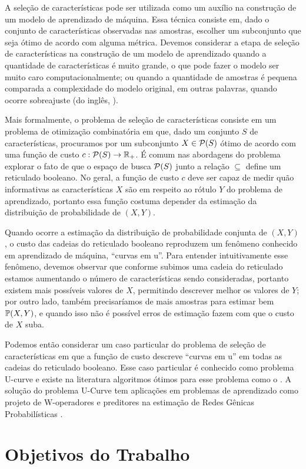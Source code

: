 
A seleção de características pode ser utilizada como um auxílio na
construção de um modelo de aprendizado de máquina. Essa técnica consiste
em, dado o conjunto de características observadas nas amostras, escolher
um subconjunto que seja ótimo de acordo com alguma métrica. Devemos 
considerar a etapa de seleção de características na construção de um 
modelo de aprendizado quando a quantidade de características é muito
grande, o que pode fazer o modelo ser muito caro computacionalmente; ou
quando a quantidade de amostras é pequena comparada a complexidade do 
modelo original, em outras palavras, quando ocorre sobreajuste (do 
inglês, ).

Mais formalmente, o problema de seleção de características consiste em
um problema de otimização combinatória em que, dado um conjunto $S$ de 
características, procuramos por um subconjunto $X \in \mathcal{P} (S)$
ótimo de acordo com uma função de custo $c : \mathcal{P}(S) \to 
\mathbb{R}_{+}$. É comum nas abordagens do problema explorar o fato de que
o espaço de busca $\mathcal{P}(S)$ junto a relação $\subseteq$ define um
reticulado booleano. No geral, a função de custo $c$ deve ser capaz de
medir quão informativas as características $X$ são em respeito ao rótulo
$Y$ do problema de aprendizado, portanto essa função costuma depender da
estimação da distribuição de probabilidade de $(X, Y)$.

Quando ocorre a estimação da distribuição de probabilidade conjunta de 
$(X, Y)$, o custo das cadeias do reticulado booleano reproduzem um
fenômeno conhecido em aprendizado de máquina, ``curvas em u''. Para 
entender intuitivamente esse fenômeno, devemos observar que conforme 
subimos uma cadeia do reticulado estamos aumentando o número de 
características sendo consideradas, portanto existem mais possíveis
valores de $X$, permitindo descrever melhor os valores de $Y$; por outro
lado, também precisaríamos de mais amostras para estimar bem 
$\mathbb{P} (X, Y)$, e quando isso não é possível erros de estimação
fazem com que o custo de $X$ suba.

Podemos então considerar um caso particular do problema de seleção de
características em que a função de custo descreve ``curvas em u''
em todas as cadeias do reticulado booleano. Esse caso particular é 
conhecido como problema U-curve e existe na literatura algoritmos ótimos
para esse problema como o . A solução do problema
U-Curve tem aplicações em problemas de aprendizado como projeto de 
W-operadores \cite{MJCJJB} e preditores na estimação de Redes Gênicas 
Probabilísticas \cite{BCJMJ07}.




\section{Objetivos do Trabalho}
